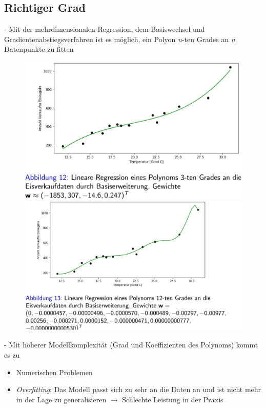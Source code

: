 \documentclass{report}
\begin{document}
  \subsection{Richtiger Grad}	
  - Mit der mehrdimensionalen Regression, dem Basiswechsel und Gradientenabstiegsverfahren ist es möglich, ein Polyon \textit{n}-ten Grades an \textit{n} Datenpunkte zu fitten	
  \begin{figure}[H]	
    \centering	
    \begin{minipage}[b]{0.4\textwidth}	
      \includegraphics[scale=.2125]{ml02_7}	
    \end{minipage}	
    \hfill	
    \begin{minipage}[b]{0.4\textwidth}	
      \includegraphics[scale=.2125]{ml02_8}	
    \end{minipage}	
  \end{figure}	
  
  - Mit höherer Modellkomplexität (Grad und Koeffizienten des Polynoms) kommt es zu\\	
  \vspace*{-1.25em}	
  \begin{itemize}	
    \item Numerischen Problemen	
    \item \textit{Overfitting}: Das Modell passt sich zu sehr an die Daten an und ist nicht mehr in der Lage zu generalisieren	
    $\rightarrow$ Schlechte Leistung in der Praxis	
  \end{itemize}	
  
\end{document}
